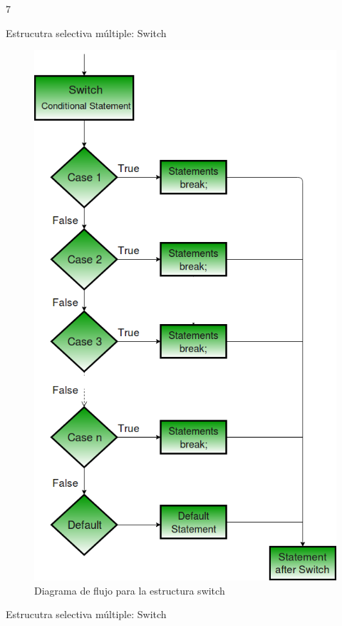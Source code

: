 7\documentclass[xcolor=pdftex,table,11pt]{beamer}
\begin{document}
\begin{frame}{Estrucutra selectiva múltiple: Switch}

\begin{figure}

\includegraphics[scale=0.201]{../img/exported/switch.png}
\caption{Diagrama de flujo para la estructura switch}
\end{figure}
\end{frame}


\begin{frame}{Estrucutra selectiva múltiple: Switch}
\codesetstylefrombeamer
{}
\end{frame}
\end{document}
